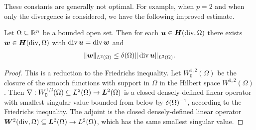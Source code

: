 \documentclass[10pt,a4paper]{article}
\begin{document}




These constants are generally not optimal. 
For example, when $p=2$ and when only the divergence is considered, 
we have the following improved estimate. 

\begin{lemma}\label{lemma:PFfordivergence}
    Let $\Omega \subseteq {\mathbb R}^{n}$ be a bounded open set. 
    Then for each $\bm{u} \in \bm{H}(\operatorname{div},\Omega)$ there exists $\bm{w} \in \bm{H}(\operatorname{div},\Omega)$ with $\operatorname{div} \bm{u} = \operatorname{div} \bm{w}$ and 
    \begin{align*}
        \| \bm{w} \|_{L^{2}(\Omega)} 
        \leq 
        {\delta}(\Omega) \| \operatorname{div} \bm{u} \|_{L^{2}(\Omega)}
        .
    \end{align*}
\end{lemma}
\begin{proof}
    This is a reduction to the Friedrichs inequality. 
    Let $W^{1,2}_{0}(\Omega)$ be the closure of the smooth functions with support in $\Omega$ in the Hilbert space $W^{1,2}(\Omega)$. 
    Then $\nabla : W^{1,2}_{0}(\Omega) \subseteq L^{2}(\Omega) \rightarrow \bm{L}^{2}(\Omega)$ is a closed densely-defined linear operator 
    with smallest singular value bounded from below by ${\delta}(\Omega)^{-1}$, according to the Friedrichs inequality. 
    The adjoint is the closed densely-defined linear operator $\bm{W}^{2}(\operatorname{div},\Omega) \subseteq \bm{L}^{2}(\Omega) \rightarrow L^{2}(\Omega)$,
    which has the same smallest singular value. 
\end{proof}
\end{document}
